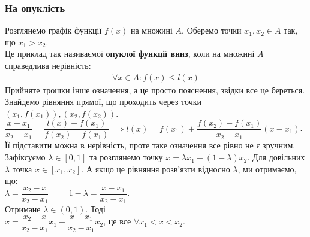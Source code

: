 \documentclass[a4paper, 14pt]{article}
\theoremstyle{theoremdd}
\theoremstyle{theoremdd}
\theoremstyle{theoremdd}
\theoremstyle{theoremdd}
\theoremstyle{theoremdd}
\theoremstyle{theoremdd}
\theoremstyle{theoremdd}
\theoremstyle{theoremdd}
\begin{document}
\subsubsection{На опуклість}
Розглянемо графік функції $f(x)$ на множині $A$. Оберемо точки $x_1,x_2 \in A$ так, що $x_1 > x_2$.
\\ \iffalse %
\begin{figure}[H]
\centering
\begin{tikzpicture}
\draw[thick, ->] (-2,0)--(4,0) node[anchor = north] {$x$};
\draw[thick, ->] (0,-0.5)--(0,5) node[anchor = east] {$y$};

\draw[thick, domain=-1.5:4, variable=\x, samples = 1000] plot({\x}, {0.5*(\x-1)^2}) node at (2,1.2) {$f(x)$};
\node[black] at (-1,2) [circle,fill,inner sep=1pt, draw = black]{};
\node[black] at (3.5,3.125) [circle,fill,inner sep=1pt, draw = black]{};
\draw (-1,2)--(3.5,3.125) node[anchor = south east] {$l(x)$};
\draw[dashed] (-1,2)--(-1,0) node [anchor = north] {$x_1$};
\draw[dashed] (3.5,3.125)--(3.5,0) node [anchor = north] {$x_2$};

\end{tikzpicture}
\end{figure}
\fi %
Це приклад так називаємої \textbf{опуклої функції вниз}, коли на множині $A$ справедлива нерівність:
\begin{align*}
\forall x \in A: f(x) \leq l(x)
\end{align*}
Прийняте трошки інше означення, а це просто пояснення, звідки все це береться.\\
Знайдемо рівняння прямої, що проходить через точки $(x_1,f(x_1)), (x_2,f(x_2))$.\\
$\dfrac{x-x_1}{x_2-x_1} = \dfrac{l(x)-f(x_1)}{f(x_2)-f(x_1)} \implies l(x) = f(x_1) + \dfrac{f(x_2)-f(x_1)}{x_2-x_1}(x-x_1)$.\\
Її підставити можна в нерівність, проте таке означення все рівно не є зручним. Зафіксуємо $\lambda \in [0,1]$ та розглянемо точку $x = \lambda x_1 + (1-\lambda) x_2$. Для довільних $\lambda$ точка $x \in [x_1,x_2]$. А якщо це рівняння розв'язти відносно $\lambda$, ми отримаємо, що:\\
$\lambda = \dfrac{x_2-x}{x_2-x_1} \hspace{1cm} 1-\lambda = \dfrac{x-x_1}{x_2-x_1}$.\\
Отримане $\lambda \in (0,1)$. Тоді\\
$x = \dfrac{x_2-x}{x_2-x_1} x_1 + \dfrac{x-x_1}{x_2-x_1} x_2$, це все $\forall x_1 < x < x_2$.\\
\end{document}
